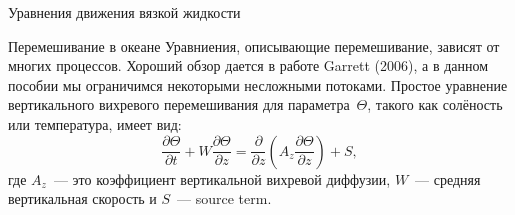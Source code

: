 \begin{chapter}{Уравнения движения вязкой жидкости}
\begin{section}{Перемешивание в океане}
Уравниения, описывающие перемешивание, зависят от многих процессов.
Хороший обзор дается в работе Garrett (2006), а в данном пособии мы
ограничимся некоторыми несложными потоками. Простое уравнение вертикального
вихревого перемешивания для параметра~$\Theta$, такого как солёность или
температура, имеет вид:
\begin{equation}\label{eq:8.21}
\frac{\partial \Theta}{\partial t} + W \frac{\partial \Theta}{\partial z}
 = \frac{\partial}{\partial z} \left(A_z\frac{\partial \Theta}{\partial z}\right) + S,
\end{equation}
где $A_z$~--- это коэффициент вертикальной вихревой диффузии,
$W$~--- средняя вертикальная скорость и $S$~--- source term.
%


\end{section}
\end{chapter}
